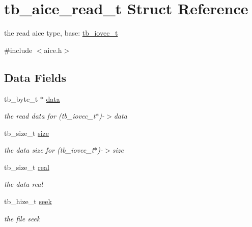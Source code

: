 \hypertarget{structtb__aice__read__t}{\section{tb\-\_\-aice\-\_\-read\-\_\-t Struct Reference}
\label{structtb__aice__read__t}
}


the read aice type, base\-: \hyperlink{structtb__iovec__t}{tb\-\_\-iovec\-\_\-t}  




{\ttfamily \#include $<$aice.\-h$>$}

\subsection*{Data Fields}
\begin{DoxyCompactItemize}
\item 
\hypertarget{structtb__aice__read__t_a938121e2f1ed6786e23ca5d407b83ed4}{tb\-\_\-byte\-\_\-t $\ast$ \hyperlink{structtb__aice__read__t_a938121e2f1ed6786e23ca5d407b83ed4}{data}}\label{structtb__aice__read__t_a938121e2f1ed6786e23ca5d407b83ed4}

\begin{DoxyCompactList}\small\item\em the read data for (tb\-\_\-iovec\-\_\-t$\ast$)-\/$>$data \end{DoxyCompactList}\item 
\hypertarget{structtb__aice__read__t_aeb51e11cbd1153affd5bb6186f9d913c}{tb\-\_\-size\-\_\-t \hyperlink{structtb__aice__read__t_aeb51e11cbd1153affd5bb6186f9d913c}{size}}\label{structtb__aice__read__t_aeb51e11cbd1153affd5bb6186f9d913c}

\begin{DoxyCompactList}\small\item\em the data size for (tb\-\_\-iovec\-\_\-t$\ast$)-\/$>$size \end{DoxyCompactList}\item 
\hypertarget{structtb__aice__read__t_a9199dcbcf0c646e6789ca09a137b752b}{tb\-\_\-size\-\_\-t \hyperlink{structtb__aice__read__t_a9199dcbcf0c646e6789ca09a137b752b}{real}}\label{structtb__aice__read__t_a9199dcbcf0c646e6789ca09a137b752b}

\begin{DoxyCompactList}\small\item\em the data real \end{DoxyCompactList}\item 
\hypertarget{structtb__aice__read__t_ab4e27c5647d8bcb281170d397976fca9}{tb\-\_\-hize\-\_\-t \hyperlink{structtb__aice__read__t_ab4e27c5647d8bcb281170d397976fca9}{seek}}\label{structtb__aice__read__t_ab4e27c5647d8bcb281170d397976fca9}

\begin{DoxyCompactList}\small\item\em the file seek \end{DoxyCompactList}\end{DoxyCompactItemize}


